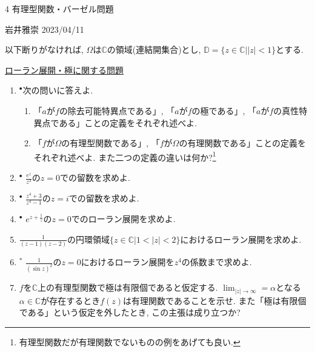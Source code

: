 \documentclass[dvipdfmx,a4paper,11pt]{article}
\newcommand{\C}{\mathbb{C}}
\newcommand{\D}{\mathbb{D}}
\theoremstyle{definition}
\begin{document}

\begin{center}
{\Large 4 有理型関数・バーゼル問題}
\end{center}

\begin{flushright}
 岩井雅崇 2023/04/11
\end{flushright}
以下断りがなければ, $\Omega$は$\C$の領域(連結開集合)とし, $\D=\{z \in \C |  |z| <1\}$とする. 

\vspace{12pt}
\hspace{-24pt}\underline{ローラン展開・極に関する問題}

\begin{enumerate}[label=\textbf{問}4.\arabic*]


\item $^{\bullet}$次の問いに答えよ. %
   \begin{enumerate}
 \setlength{\parskip}{0cm} 
  \setlength{\itemsep}{0cm} 
  \item 「$a$が$f$の除去可能特異点である」, 「$a$が$f$の極である」, 「$a$が$f$の真性特異点である」ことの定義をそれぞれ述べよ.
  \item 「$f$が$\Omega$の有理型関数である」, 「$f$が$\Omega$の有理関数である」ことの定義をそれぞれ述べよ. また二つの定義の違いは何か?\footnote{有理型関数だが有理関数でないものの例をあげても良い. }
    \end{enumerate}
    
 
\item $^{\bullet}$ $\frac{e^z}{z^3}$の$z=0$での留数を求めよ.
\item $^{\bullet}$ $\frac{z^4 + 3}{z^4 -1}$の$z=i$での留数を求めよ.
\item $^{\bullet}$ $e^{z + \frac{1}{z}}$の$z=0$でのローラン展開を求めよ.

\item $\frac{1}{(z-1)(z-2)}$の円環領域$\{ z\in \C | 1 < |z| < 2\}$におけるローラン展開を求めよ.

\item  $^{*}$ $\frac{1}{(\sin z)^2}$の$z=0$におけるローラン展開を$z^4$の係数まで求めよ.

 \item $f$を$\C$上の有理型関数で極は有限個であると仮定する. $\lim_{|z| \rightarrow \infty} = \alpha $となる$\alpha \in \C$が存在するとき$f(z)$は有理関数であることを示せ.
   また「極は有限個である」という仮定を外したとき, この主張は成り立つか?
       

\end{enumerate}
\end{document}

